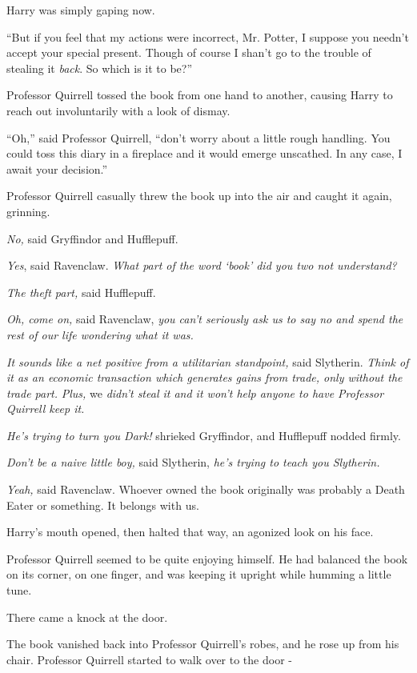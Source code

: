 Harry was simply gaping now.

``But if you feel that my actions were incorrect, Mr. Potter, I suppose you needn't accept your special present. Though of course I shan't go to the trouble of stealing it \emph{back}. So which is it to be?''

Professor Quirrell tossed the book from one hand to another, causing Harry to reach out involuntarily with a look of dismay.

``Oh,'' said Professor Quirrell, ``don't worry about a little rough handling. You could toss this diary in a fireplace and it would emerge unscathed. In any case, I await your decision.''

Professor Quirrell casually threw the book up into the air and caught it again, grinning.

\emph{No,} said Gryffindor and Hufflepuff.

\emph{Yes}, said Ravenclaw. \emph{What part of the word `book' did you two not understand?}

\emph{The theft part,} said Hufflepuff.

\emph{Oh, come on,} said Ravenclaw, \emph{you can't seriously ask us to say no and spend the rest of our life wondering what it was.}

\emph{It sounds like a net positive from a utilitarian standpoint,} said Slytherin. \emph{Think of it as an economic transaction which generates gains from trade, only without the trade part.} \emph{Plus,} we \emph{didn't steal it and it won't help anyone to have Professor Quirrell keep it.}

\emph{He's trying to turn you Dark!} shrieked Gryffindor, and Hufflepuff nodded firmly.

\emph{Don't be a naive little boy,} said Slytherin, \emph{he's trying to teach you Slytherin.}

\emph{Yeah,} said Ravenclaw. Whoever owned the book originally was probably a Death Eater or something. It belongs with us.

Harry's mouth opened, then halted that way, an agonized look on his face.

Professor Quirrell seemed to be quite enjoying himself. He had balanced the book on its corner, on one finger, and was keeping it upright while humming a little tune.

There came a knock at the door.

The book vanished back into Professor Quirrell's robes, and he rose up from his chair. Professor Quirrell started to walk over to the door -

